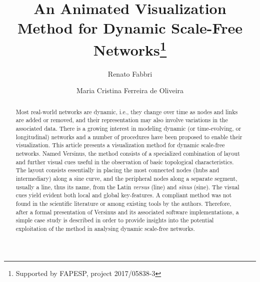 \documentclass[runningheads]{llncs}
\begin{document}
%
\title{An Animated Visualization Method for Dynamic Scale-Free Networks\thanks{Supported by FAPESP, project 2017/05838-3}}
%
%
\author{Renato Fabbri \and
Maria Cristina Ferreira de Oliveira}
%
%
%
\maketitle              %
%
\begin{abstract}
Most real-world networks are dynamic, i.e., they change over time as nodes and links are added or removed, and their representation may also involve variations in the associated data.
There is a growing interest in modeling dynamic (or time-evolving, or longitudinal) networks and
a number of procedures have been proposed to enable their visualization.
  This article presents a visualization method for dynamic scale-free networks.
  Named Versinus, the method consists of a specialized combination of layout and further visual cues
  useful in the observation of basic topological characteristics.
  The layout consists essentially in placing the most connected nodes (hubs and intermediary)
  along a sine curve, and the peripheral nodes along a separate segment, usually a line,
  thus its name, from the Latin \emph{versus} (line) and \emph{sinus} (sine).
  The visual cues yield evident both local and global key-features.
  A compliant method was not found in the scientific literature or among existing tools by the authors.
  Therefore, after a formal presentation of Versinus and its associated software implementations,
  a simple case study is described in order to provide insights into the potential exploitation of the method
  in analysing dynamic scale-free networks.
\end{abstract}
\end{document}
